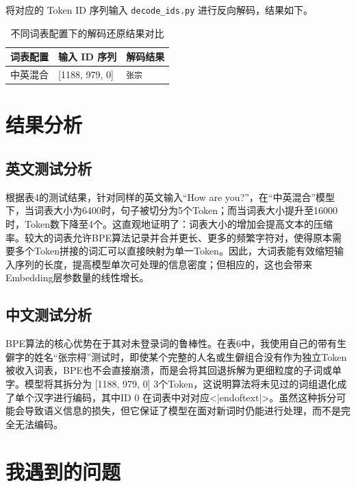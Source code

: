\documentclass[a4paper,12pt]{ctexart} %
\begin{document}
将对应的 Token ID 序列输入 \texttt{decode\_ids.py} 进行反向解码，结果如下。

\begin{table}[H]
    \centering
    \begin{tabular}{p{} p{} p{}}
        \toprule
        词表配置 & 输入 ID 序列 & 解码结果 \\
        \midrule
        中英混合 & [1188, 979, 0] & \texttt{张宗 } \\
        \bottomrule
    \end{tabular}
    \caption{不同词表配置下的解码还原结果对比}
\end{table}



\section{结果分析}
\subsection{英文测试分析}
根据表4的测试结果，针对同样的英文输入“How are you?”，在“中英混合”模型下，当词表大小为6400时，句子被切分为5个Token；而当词表大小提升至16000时，Token数下降至4个。这直观地证明了：词表大小的增加会提高文本的压缩率。较大的词表允许BPE算法记录并合并更长、更多的频繁字符对，使得原本需要多个Token拼接的词汇可以直接映射为单一Token。因此，大词表能有效缩短输入序列的长度，提高模型单次可处理的信息密度；但相应的，这也会带来Embedding层参数量的线性增长。

\subsection{中文测试分析}
BPE算法的核心优势在于其对未登录词的鲁棒性。在表6中，我使用自己的带有生僻字的姓名“张宗桪”测试时，即使某个完整的人名或生僻组合没有作为独立Token被收入词表，BPE也不会直接崩溃，而是会将其回退拆解为更细粒度的子词或单字。模型将其拆分为 [1188, 979, 0] 3个Token，这说明算法将未见过的词组退化成了单个汉字进行编码，其中ID 0 在词表中对对应<|endoftext|>。虽然这种拆分可能会导致语义信息的损失，但它保证了模型在面对新词时仍能进行处理，而不是完全无法编码。

\section{我遇到的问题}
\end{document}
